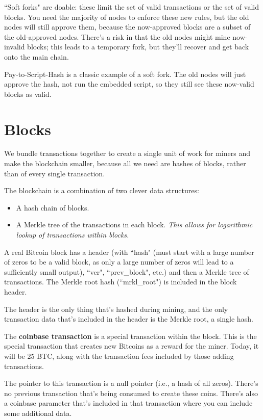 \documentclass[12pt]{article}
\begin{document}
``Soft forks" are doable: these limit the set of valid transactions or the set of valid blocks. You need the majority of nodes to enforce these new rules, but the old nodes will still approve them, because the now-approved blocks are a subset of the old-approved nodes. There's a risk in that the old nodes might mine now-invalid blocks; this leads to a temporary fork, but they'll recover and get back onto the main chain.

Pay-to-Script-Hash is a classic example of a soft fork. The old nodes will just approve the hash, not run the embedded script, so they still see these now-valid blocks as valid.

\section*{Blocks}

We bundle transactions together to create a single unit of work for miners and make the blockchain smaller, because all we need are hashes of blocks, rather than of every single transaction.

The blockchain is a combination of two clever data structures:
\begin{itemize}
\item A hash chain of blocks.
\item A Merkle tree of the transactions in each block. \textit{This allows for logarithmic lookup of transactions within blocks.}
\end{itemize}

A real Bitcoin block has a header (with ``hash" (must start with a large number of zeros to be a valid block, as only a large number of zeros will lead to a sufficiently small output), ``ver", ``prev\_block", etc.) and then a Merkle tree of transactions. The Merkle root hash (``mrkl\_root") is included in the block header.

The header is the only thing that's hashed during mining, and the only transaction data that's included in the header is the Merkle root, a single hash.

The \textbf{coinbase transaction} is a special transaction within the block. This is the special transaction that creates new Bitcoins as a reward for the miner. Today, it will be 25 BTC, along with the transaction fees included by those adding transactions.

The pointer to this transaction is a null pointer (i.e., a hash of all zeros). There's no previous transaction that's being consumed to create these coins. There's also a coinbase parameter that's included in that transaction where you can include some additional data.
\end{document}
